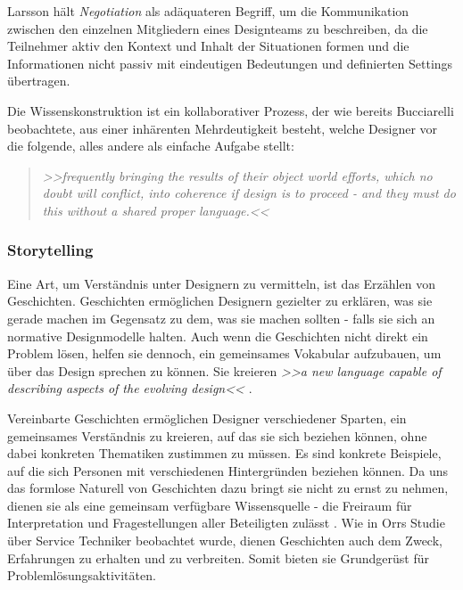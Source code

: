 \medskip Larsson hält \emph{Negotiation} als adäquateren Begriff, um die Kommunikation zwischen den einzelnen Mitgliedern eines Designteams zu beschreiben, da die Teilnehmer aktiv den Kontext und Inhalt der Situationen formen und die Informationen nicht passiv mit eindeutigen Bedeutungen und definierten Settings übertragen. \citep{Larsson:2003} 

Die Wissenskonstruktion ist ein kollaborativer Prozess, der wie bereits Bucciarelli beobachtete, aus einer inhärenten Mehrdeutigkeit besteht, welche Designer vor die folgende, alles andere als einfache Aufgabe stellt: 

\begin{quote}
	\textsl{>>frequently bringing the results of their object world efforts, which no doubt will conflict, into coherence if design is to proceed - and they must do this without a shared proper language.<<}
\begin{flushright}\citep{Bucciarelli:2002}\end{flushright}
\end{quote}

\subsubsection{Storytelling} 
Eine Art, um Verständnis unter Designern zu vermitteln, ist das Erzählen von Geschichten. Geschichten ermöglichen Designern gezielter zu erklären, was sie gerade machen im Gegensatz zu dem, was sie machen sollten - falls sie sich an normative Designmodelle halten. Auch wenn die Geschichten nicht direkt ein Problem lösen, helfen sie dennoch, ein gemeinsames Vokabular aufzubauen, um über das Design sprechen zu können. Sie kreieren \emph{>>a new language capable of describing aspects of the evolving design<<} \citep{Lloyd:2000}.

\medskip Vereinbarte Geschichten ermöglichen Designer verschiedener Sparten, ein gemeinsames Verständnis zu kreieren, auf das sie sich beziehen können, ohne dabei konkreten Thematiken zustimmen zu müssen. Es sind konkrete Beispiele, auf die sich Personen mit verschiedenen Hintergründen beziehen können. Da uns das formlose Naturell von Geschichten dazu bringt sie nicht zu ernst zu nehmen, dienen sie als eine gemeinsam verfügbare Wissensquelle - die Freiraum für Interpretation und Fragestellungen aller Beteiligten zulässt \citep{Erickson:1996}. Wie in Orrs Studie über Service Techniker \citep{Orr:1986} beobachtet wurde, dienen Geschichten auch dem Zweck, Erfahrungen zu erhalten und zu verbreiten. Somit bieten sie Grundgerüst für Problemlösungsaktivitäten.

